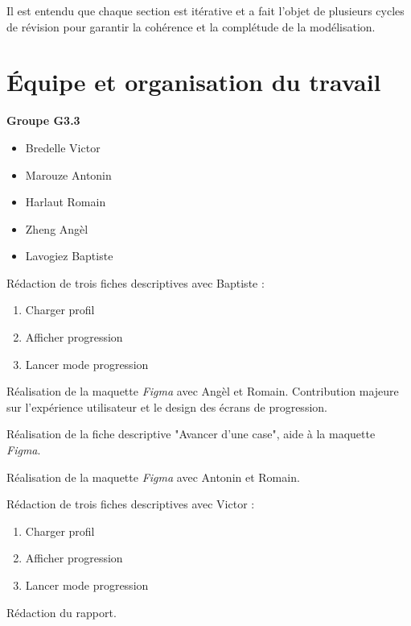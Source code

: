 \documentclass{butexFR}
\begin{document}
Il est entendu que chaque section est itérative et a fait l'objet de plusieurs cycles de révision pour garantir la cohérence et la complétude de la modélisation.

\section{Équipe et organisation du travail}
\textbf{Groupe G3.3}

\begin{itemize}
    \item Bredelle Victor
    \item Marouze Antonin
    \item Harlaut Romain
    \item Zheng Angèl
    \item Lavogiez Baptiste
\end{itemize}


Rédaction de trois fiches descriptives avec Baptiste :
\begin{enumerate}
    \item Charger profil
    \item Afficher progression
    \item Lancer mode progression
\end{enumerate}


Réalisation de la maquette \textit{Figma} avec Angèl et Romain. Contribution majeure sur l'expérience utilisateur et le design des écrans de progression.


Réalisation de la fiche descriptive "Avancer d'une case", aide à la maquette \textit{Figma}.


Réalisation de la maquette \textit{Figma} avec Antonin et Romain.


Rédaction de trois fiches descriptives avec Victor :
\begin{enumerate}
    \item Charger profil
    \item Afficher progression
    \item Lancer mode progression
\end{enumerate}

Rédaction du rapport.

\end{document}
